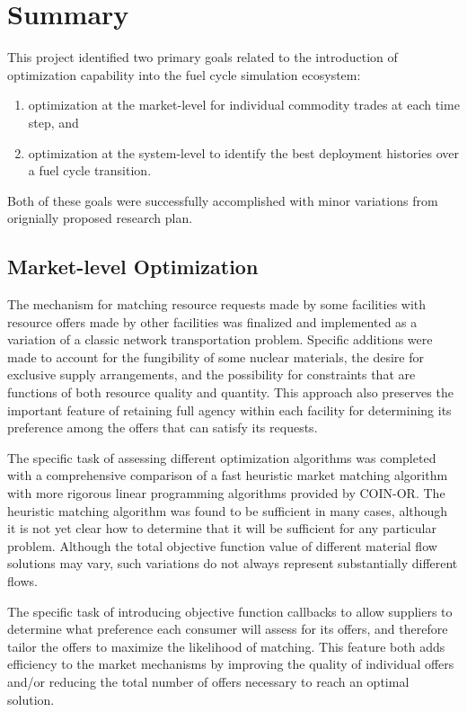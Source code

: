 \section{Summary}

This project identified two primary goals related to the introduction of
optimization capability into the \Cyclus{} fuel cycle simulation ecosystem:
\begin{enumerate}
\item optimization at the market-level for individual commodity trades at each time step, and 
\item optimization at the system-level to identify the best deployment
  histories over a fuel cycle transition.
\end{enumerate}
\noindent Both of these goals were successfully accomplished with minor variations from
orignially proposed research plan.

\subsection{Market-level Optimization}

The mechanism for matching resource requests made by some facilities with
resource offers made by other facilities was finalized and implemented as a
variation of a classic network transportation problem.  Specific additions
were made to account for the fungibility of some nuclear materials, the desire
for exclusive supply arrangements, and the possibility for constraints that
are functions of both resource quality and quantity.  This approach also
preserves the important feature of retaining full agency within each facility
for determining its preference among the offers that can satisfy its requests.

The specific task of assessing different optimization algorithms was completed
with a comprehensive comparison of a fast heuristic market matching algorithm
with more rigorous linear programming algorithms provided by \gls{COIN-OR}.
The heuristic matching algorithm was found to be sufficient in many cases,
although it is not yet clear how to determine that it will be sufficient for
any particular problem.  Although the total objective function value of
different material flow solutions may vary, such variations do not always
represent substantially different flows.

The specific task of introducing objective function callbacks to allow
suppliers to determine what preference each consumer will assess for its
offers, and therefore tailor the offers to maximize the likelihood of
matching.  This feature both adds efficiency to the market mechanisms by
improving the quality of individual offers and/or reducing the total number of
offers necessary to reach an optimal solution.

